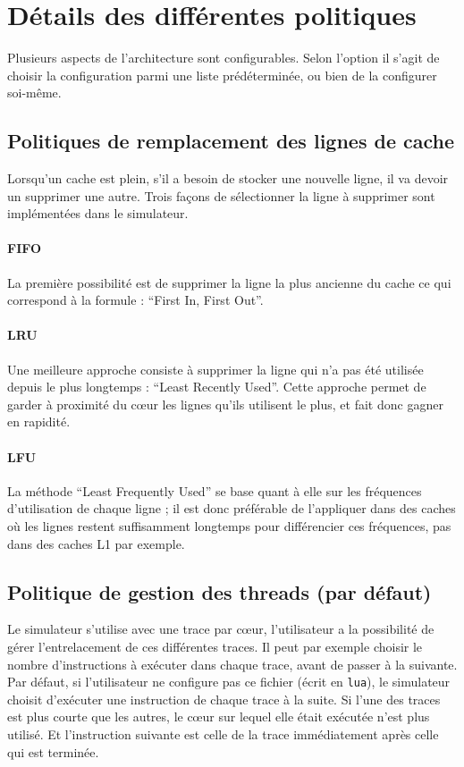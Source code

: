 \section{Détails des différentes politiques}
\label{politiques}

Plusieurs aspects de l'architecture sont configurables. Selon l'option il s'agit de choisir la configuration parmi une liste prédéterminée, ou bien de la configurer soi-même. 

\subsection{Politiques de remplacement des lignes de cache}

Lorsqu'un cache est plein, s'il a besoin de stocker une nouvelle ligne, il va devoir un supprimer une autre. Trois façons de sélectionner la ligne à supprimer sont implémentées dans le simulateur. 

\paragraph{FIFO}La première possibilité est de  supprimer la ligne la plus ancienne du cache ce qui correspond à la formule : ``First In, First Out''.

\paragraph{LRU}Une meilleure approche consiste à supprimer la ligne qui n'a pas été utilisée depuis le plus longtemps : ``Least Recently Used''. Cette approche permet de garder à proximité du c\oe ur les lignes qu'ils utilisent le plus, et fait donc gagner en rapidité.

\paragraph{LFU}La méthode ``Least Frequently Used'' se base quant à elle sur les fréquences d'utilisation de chaque ligne ; il est donc préférable de l'appliquer dans des caches où les lignes restent suffisamment longtemps pour différencier ces fréquences, pas dans des caches L1 par exemple. 

\subsection{Politique de gestion des threads (par défaut)}

Le simulateur s'utilise avec une trace par c\oe ur, l'utilisateur a la possibilité de gérer l'entrelacement de ces différentes traces. Il peut par exemple choisir le nombre d'instructions à exécuter dans chaque trace, avant de passer à la suivante.  
Par défaut, si l'utilisateur ne configure pas ce fichier (écrit en \texttt{lua}), le simulateur choisit d'exécuter une instruction de chaque trace à la suite. Si l'une des traces est plus courte que les autres, le c\oe ur sur lequel elle était exécutée n'est plus utilisé. Et l'instruction suivante est celle de la trace immédiatement après celle qui est terminée.

